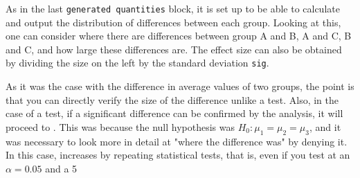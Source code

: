 \documentclass{ltjsbook}
\begin{document}


As in the last \verb|generated quantities| block, it is set up to be able to calculate and output the distribution of differences between each group. Looking at this, one can consider where there are differences between group A and B, A and C, B and C, and how large these differences are. The effect size can also be obtained by dividing the size on the left by the standard deviation \verb|sig|.

As it was the case with the difference in average values of two groups, the point is that you can directly verify the size of the difference unlike a test. Also, in the case of a test, if a significant difference can be confirmed by the analysis, it will proceed to . This was because the null hypothesis was $H_0:\mu_1 = \mu_2 = \mu_3$, and it was necessary to look more in detail at "where the difference was" by denying it. In this case,  increases by repeating statistical tests, that is, even if you test at an $\alpha = 0.05$ and a 5%
\end{document}
